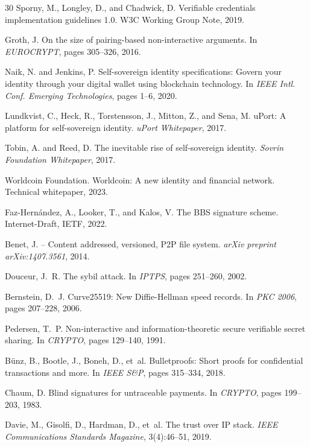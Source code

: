 \documentclass[11pt,a4paper]{article}
\begin{document}
\begin{thebibliography}{30}
Sporny, M., Longley, D., and Chadwick, D.
\newblock Verifiable credentials implementation guidelines 1.0.
\newblock W3C Working Group Note, 2019.

Groth, J.
\newblock On the size of pairing-based non-interactive arguments.
\newblock In \emph{EUROCRYPT}, pages 305--326, 2016.

Naik, N. and Jenkins, P.
\newblock Self-sovereign identity specifications: Govern your identity through your digital wallet using blockchain technology.
\newblock In \emph{IEEE Intl. Conf. Emerging Technologies}, pages 1--6, 2020.

Lundkvist, C., Heck, R., Torstensson, J., Mitton, Z., and Sena, M.
\newblock uPort: A platform for self-sovereign identity.
\newblock \emph{uPort Whitepaper}, 2017.

Tobin, A. and Reed, D.
\newblock The inevitable rise of self-sovereign identity.
\newblock \emph{Sovrin Foundation Whitepaper}, 2017.

Worldcoin Foundation.
\newblock Worldcoin: A new identity and financial network.
\newblock Technical whitepaper, 2023.

Faz-Hern\'andez, A., Looker, T., and Kalos, V.
\newblock The {BBS} signature scheme.
\newblock Internet-Draft, IETF, 2022.

Benet, J.
 -- Content addressed, versioned, {P2P} file system.
\newblock \emph{arXiv preprint arXiv:1407.3561}, 2014.

Douceur, J.~R.
\newblock The sybil attack.
\newblock In \emph{IPTPS}, pages 251--260, 2002.

Bernstein, D.~J.
\newblock Curve25519: New {Diffie-Hellman} speed records.
\newblock In \emph{PKC 2006}, pages 207--228, 2006.

Pedersen, T.~P.
\newblock Non-interactive and information-theoretic secure verifiable secret sharing.
\newblock In \emph{CRYPTO}, pages 129--140, 1991.

B\"unz, B., Bootle, J., Boneh, D., et~al.
\newblock Bulletproofs: Short proofs for confidential transactions and more.
\newblock In \emph{IEEE S\&P}, pages 315--334, 2018.

Chaum, D.
\newblock Blind signatures for untraceable payments.
\newblock In \emph{CRYPTO}, pages 199--203, 1983.

Davie, M., Gisolfi, D., Hardman, D., et~al.
\newblock The trust over {IP} stack.
\newblock \emph{IEEE Communications Standards Magazine}, 3(4):46--51, 2019.

\end{thebibliography}
\end{document}
